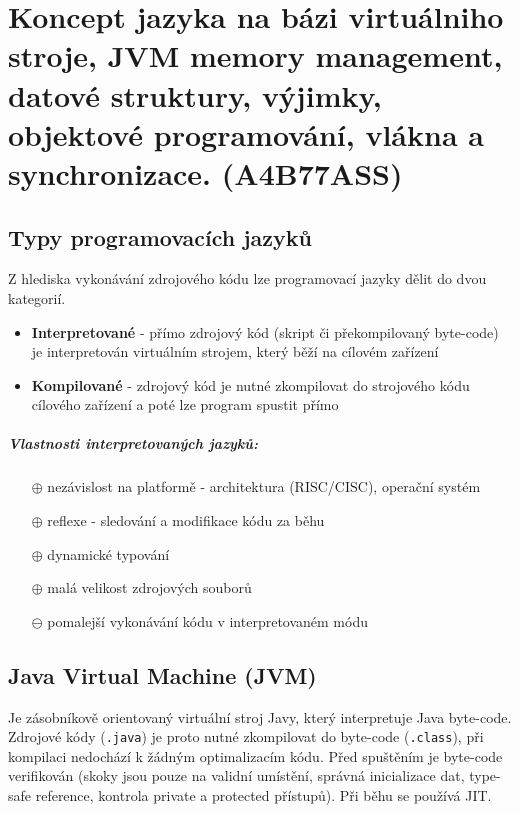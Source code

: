 \documentclass{scrreprt}
\begin{document}
\setcounter{chapter}{6}
\chapter{Koncept jazyka na bázi virtuálniho stroje, JVM memory management, datové struktury, výjimky, objektové programování, vlákna a synchronizace. (A4B77ASS)}

\section{Typy programovacích jazyků}
Z hlediska vykonávání zdrojového kódu lze programovací jazyky dělit do dvou kategorií.
\begin{itemize}
\item \textbf{Interpretované} - přímo zdrojový kód (skript či překompilovaný byte-code) je interpretován virtuálním strojem, který běží na cílovém zařízení
\item \textbf{Kompilované} - zdrojový kód je nutné zkompilovat do strojového kódu cílového zařízení a poté lze program spustit přímo
\end{itemize}

\paragraph*{Vlastnosti interpretovaných jazyků:}
\begin{itemize}
\item[$\oplus$] nezávislost na platformě - architektura (RISC/CISC), operační systém
\item[$\oplus$] reflexe - sledování a modifikace kódu za běhu
\item[$\oplus$] dynamické typování
\item[$\oplus$] malá velikost zdrojových souborů
\item[$\ominus$] pomalejší vykonávání kódu v interpretovaném módu
\end{itemize}

\section{Java Virtual Machine (JVM)}
Je zásobníkově orientovaný virtuální stroj Javy, který interpretuje Java byte-code. Zdrojové kódy (\texttt{.java}) je proto nutné zkompilovat do byte-code (\texttt{.class}), při kompilaci nedochází k žádným optimalizacím kódu. Před spuštěním je byte-code verifikován (skoky jsou pouze na validní umístění, správná inicializace dat, type-safe reference, kontrola private a protected přístupů). Při běhu se používá JIT.
\end{document}
